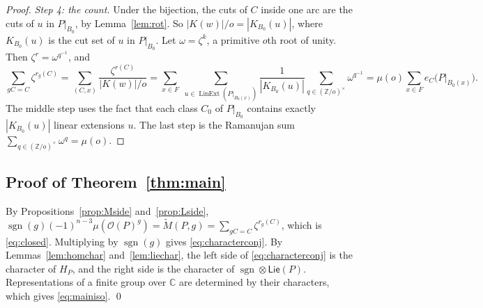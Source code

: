 \documentclass[11pt]{article}
\theoremstyle{definition}
\theoremstyle{remark}
\newcommand{\OP}{\mathcal O}
\newcommand{\Lin}{\operatorname{LinExt}}
\newcommand{\sgn}{\operatorname{sgn}}
\newcommand{\PLie}{\mathsf{Lie}}
\begin{document}
\begin{proof}
\emph{Step 4: the count.} Under the bijection, the cuts of $C$ inside one arc
are the cuts of $u$ in $P|_{B_0}$, by Lemma~\ref{lem:rot}. So
$|K(w)|/o=|K_{B_0}(u)|$, where $K_{B_0}(u)$ is the cut set of $u$ in
$P|_{B_0}$. Let $\omega=\zeta^k$, a primitive $o$th root of unity. Then
$\zeta^r=\omega^{q^{-1}}$, and
\[
\sum_{gC=C}\zeta^{r_g(C)}
=\sum_{(C,x)}\frac{\zeta^{r(C)}}{|K(w)|/o}
=\sum_{x\in F}\;\sum_{u\in\Lin(P|_{B_0(x)})}\frac{1}{|K_{B_0}(u)|}
\sum_{q\in(\mathbb Z/o)^\times}\omega^{q^{-1}}
=\mu(o)\sum_{x\in F}e_C\bigl(P|_{B_0(x)}\bigr).
\]
The middle step uses the fact that each class $C_0$ of $P|_{B_0}$ contains
exactly $|K_{B_0}(u)|$ linear extensions $u$. The last step is the
Ramanujan sum $\sum_{q\in(\mathbb Z/o)^\times}\omega^q=\mu(o)$.
\end{proof}

\subsection{Proof of Theorem~\ref{thm:main}}

By Propositions~\ref{prop:Mside} and~\ref{prop:Lside},
$\sgn(g)(-1)^{n-3}\mu(\OP(P)^g)=\widetilde M(P,g)=\sum_{gC=C}\zeta^{r_g(C)}$,
which is \eqref{eq:closed}. Multiplying by $\sgn(g)$ gives
\eqref{eq:characterconj}. By Lemmas~\ref{lem:homchar} and~\ref{lem:liechar},
the left side of \eqref{eq:characterconj} is the character of $H_P$, and the
right side is the character of $\sgn\otimes\PLie(P)$. Representations of a
finite group over $\mathbb C$ are determined by their characters, which
gives \eqref{eq:mainiso}. \qed
\end{document}
